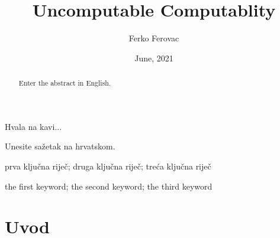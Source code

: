 \documentclass[zavrsnirad]{fer}
\title{Uncomputable Computablity}
\author{Ferko Ferovac}
\date{June, 2021}
\begin{document}
\maketitle






\begin{zahvale}
  Hvala na kavi...
\end{zahvale}


\mainmatter



\begin{sazetak}
  Unesite sažetak na hrvatskom.

  \blindtext
\end{sazetak}

\begin{kljucnerijeci}
  prva ključna riječ; druga ključna riječ; treća ključna riječ
\end{kljucnerijeci}


\begin{abstract}
  Enter the abstract in English.
  
  \blindtext 
\end{abstract}

\begin{keywords}
  the first keyword; the second keyword; the third keyword
\end{keywords}


\tableofcontents


\chapter{Uvod}
\label{pog:uvod}
\end{document}
